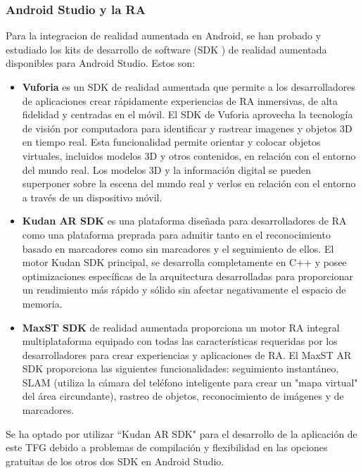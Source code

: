 \subsubsection{Android Studio y la RA}


Para la integracion de realidad aumentada en Android, se han probado y estudiado los kits de desarrollo de software (SDK \cite{URL::SDK}) de realidad aumentada disponibles para Android Studio. Estos son:



\begin{itemize}
    
    \item  \textbf{Vuforia} es un SDK de realidad aumentada que permite a los desarrolladores de aplicaciones crear rápidamente experiencias de RA inmersivas, de alta fidelidad y centradas en el móvil. El SDK de Vuforia aprovecha la tecnología de visión por computadora para identificar y rastrear imagenes y objetos 3D en tiempo real. Esta funcionalidad permite orientar y colocar objetos virtuales, incluidos modelos 3D y otros contenidos, en relación con el entorno del mundo real. Los modelos 3D y la información digital se pueden superponer sobre la escena del mundo real y verlos en relación con el entorno a través de un dispositivo móvil.

    \item \textbf{Kudan AR SDK} es una plataforma diseñada para desarrolladores de RA como una plataforma preprada para admitir tanto en el reconocimiento basado en marcadores como sin marcadores y el seguimiento de ellos. El motor Kudan SDK principal, se desarrolla completamente en C++ y posee optimizaciones específicas de la arquitectura desarrolladas para proporcionar un rendimiento más rápido y sólido sin afectar negativamente el espacio de memoria.

    \item  \textbf{MaxST SDK} de realidad aumentada proporciona un motor RA integral multiplataforma equipado con todas las características requeridas por los desarrolladores para crear experiencias y aplicaciones de RA. El MaxST AR SDK proporciona las siguientes funcionalidades: seguimiento instantáneo, SLAM \cite{URL::SLAM} (utiliza la cámara del teléfono inteligente para crear un "mapa virtual" del área circundante), rastreo de objetos, reconocimiento de imágenes y de marcadores.
\end{itemize}

Se ha optado por utilizar ``Kudan AR SDK" para el desarrollo de la aplicación de este TFG debido a problemas de compilación y flexibilidad en las opciones gratuitas de los otros dos SDK en Android Studio.  


